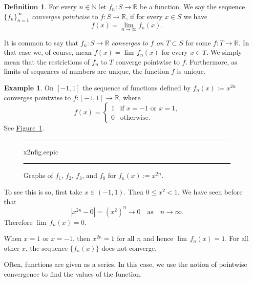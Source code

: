 \documentclass[12pt]{book}
\newenvironment{myfigureht}{%
\begin{figure}[h!t]
\noindent\rule{\textwidth}{0.4pt}\vspace{12pt}\par\centering}%
{\par\noindent\rule{\textwidth}{0.4pt}
\end{figure}}
\newcommand{\abs}[1]{\left\lvert {#1} \right\rvert}
\newcommand{\R}{{\mathbb{R}}}
\newcommand{\N}{{\mathbb{N}}}
\newcommand{\myindex}[1]{#1\index{#1}}
\theoremstyle{plain}
\theoremstyle{remark}
\theoremstyle{definition}
\newtheorem{defn}[thm]{Definition}
\theoremstyle{exercise}
\theoremstyle{example}
\newtheorem{example}[thm]{Example}
\newcommand{\figureref}[1]{\hyperref[#1]{Figure~\ref*{#1}}}
\begin{document}
\begin{defn}
For every $n \in \N$
let $f_n \colon S \to \R$ be a function.  We say the sequence
$\{ f_n \}_{n=1}^\infty$
\emph{\myindex{converges pointwise}} to $f \colon S \to \R$, if for every $x
\in S$
we have
\begin{equation*}
f(x) =
\lim_{n\to\infty} f_n(x) .
\end{equation*}
\end{defn}

It is common to say that $f_n \colon S \to \R$
\emph{converges to $f$ on $T \subset S$}
for some $f \colon T \to \R$.  In that case we, of course, mean 
$f(x) = \lim\, f_n(x)$ for every $x \in T$.  We simply mean that the
restrictions of $f_n$ to $T$ converge pointwise to $f$.
Furthermore,
as limits of sequences of numbers are unique, the function $f$ is unique.

\begin{example}
On $[-1,1]$ the sequence of functions defined by $f_n(x) := x^{2n}$
converges pointwise to $f \colon [-1,1] \to \R$, where
\begin{equation*}
f(x) =
\begin{cases}
1 & \text{if $x=-1$ or $x=1$,} \\
0 & \text{otherwise.}
\end{cases}
\end{equation*}
See \figureref{x2nfig}.

\begin{myfigureht}
{x2nfig.eepic}
\caption{Graphs of $f_1$, $f_2$, $f_3$, and $f_8$ for $f_n(x) :=
x^{2n}$.\label{x2nfig}}
\end{myfigureht}

To see this is so, first take $x \in (-1,1)$.  Then 
$0 \leq x^2 < 1$.
We have seen before that
\begin{equation*}
\abs{x^{2n} - 0} = {(x^2)}^n \to 0 \quad \text{as} \quad n \to \infty .
\end{equation*}
Therefore $\lim\,f_n(x) = 0$.

When $x = 1$ or $x=-1$, then $x^{2n} = 1$ for all $n$ and hence
$\lim\,f_n(x) = 1$.
For all other $x$, the sequence
$\{ f_n(x) \}$ does not converge.
\end{example}

Often, functions are given as a series.  In this case, we use
the notion of pointwise convergence to find the values of the function.
\end{document}

